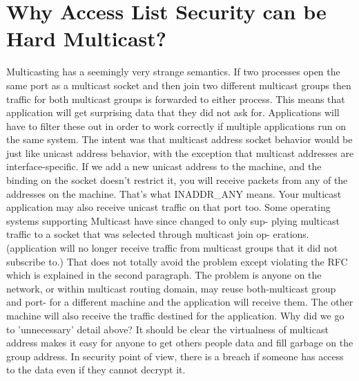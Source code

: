 \section{Why Access List Security can be Hard Multicast?}
Multicasting has a seemingly very strange semantics. If two processes open the
same port as a multicast socket and then join two different multicast groups then
traffic for both multicast groups is forwarded to either process. This means that
application will get surprising data that they did not ask for. Applications will
have to filter these out in order to work correctly if multiple applications run on
the same system.
The intent was that multicast address socket behavior would be just like unicast
address behavior, with the exception that multicast addresses are interface-specific.
If we add a new unicast address to the machine, and the binding on the socket
doesn't restrict it, you will receive packets from any of the addresses on the machine.
That's what INADDR\_ANY means. Your multicast application may also receive
unicast traffic on that port too.
Some operating systems supporting Multicast have since changed to only sup-
plying multicast traffic to a socket that was selected through multicast join op-
erations. (application will no longer receive traffic from multicast groups that it
did not subscribe to.) That does not totally avoid the problem except violating
the RFC which is explained in the second paragraph. The problem is anyone on
the network, or within multicast routing domain, may reuse both-multicast group
and port- for a different machine and the application will receive them. The other
machine will also receive the traffic destined for the application.
Why did we go to 'unnecessary' detail above? It should be clear the virtualness
of multicast address makes it easy for anyone to get others people data and fill
garbage on the group address. In security point of view, there is a breach if someone
has access to the data even if they cannot decrypt it.

